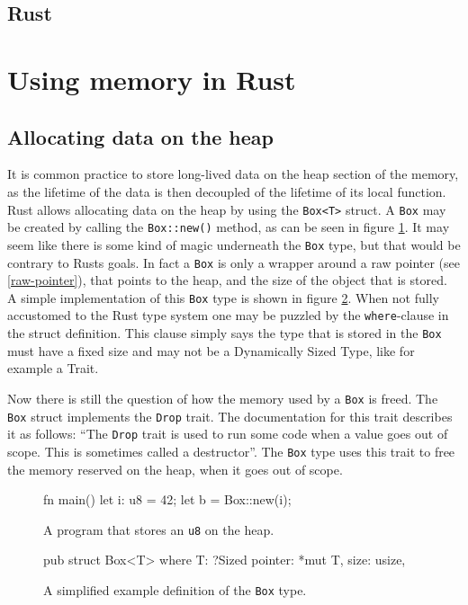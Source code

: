 \documentclass[twocolumn]{article}
\begin{document}
\subsection{Rust}
\section{Using memory in Rust}
\subsection{Allocating data on the heap}
\label{box}
It is common practice to store long-lived data on the heap section of the memory, as the lifetime of the data is then decoupled of the lifetime of its local function.
Rust allows allocating data on the heap by using the \texttt{Box<T>} struct.
A \texttt{Box} may be created by calling the \texttt{Box::new()} method, as can be seen in figure \ref{box-example}.
It may seem like there is some kind of magic underneath the \texttt{Box} type, but that would be contrary to Rusts goals.
In fact a \texttt{Box} is only a wrapper around a raw pointer (see \ref{raw-pointer}), that points to the heap, and the size of the object that is stored.
A simple implementation of this \texttt{Box} type is shown in figure \ref{box-definition}.
When not fully accustomed to the Rust type system one may be puzzled by the \texttt{where}-clause in the struct definition.
This clause simply says the type that is stored in the \texttt{Box} must have a fixed size and may not be a Dynamically Sized Type, like for example a Trait.

Now there is still the question of how the memory used by a \texttt{Box} is freed.
The \texttt{Box} struct implements the \texttt{Drop} trait.
The documentation for this trait describes it as follows: ``The \texttt{Drop} trait is used to run some code when a value goes out of scope. This is sometimes called a destructor''\cite{RustDoc-Drop}.
The \texttt{Box} type uses this trait to free the memory reserved on the heap, when it goes out of scope.
\begin{figure}
\begin{rustcode}
fn main() {
    let i: u8 = 42;
    let b = Box::new(i);
}
\end{rustcode}
\vspace{-2em}
\caption{A program that stores an \texttt{u8} on the heap.}
\label{box-example}
\end{figure}
\begin{figure}
\begin{rustcode}
pub struct Box<T> where T: ?Sized {
    pointer: *mut T,
    size: usize,
}
\end{rustcode}
\vspace{-2em}
\caption{A simplified example definition of the \texttt{Box} type.}
\label{box-definition}
\end{figure}
\end{document}
